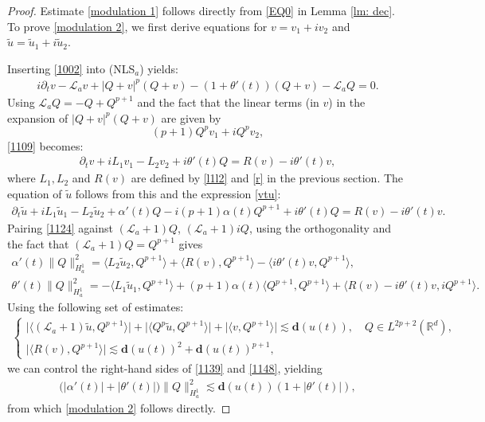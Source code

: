 \documentclass[12pt]{amsart}
\newcommand{\R}{\mathbb R}
\newcommand{\la}{\mathcal L_a}
\newcommand{\nha}{H^1_a}
\begin{document}
\begin{proof}
Estimate \eqref{modulation 1} follows directly from \eqref{EQ0} in Lemma \ref{lm: dec}. To prove \eqref{modulation 2}, we first derive equations for $v=v_1+iv_2$ and $\tilde u=\tilde u_1+i\tilde u_2$. 

Inserting \eqref{1002} into (NLS$_a$) yields:
\begin{align}\label{1109} 
i\partial_t v-\la v+|Q+v|^p(Q+v)-(1+\theta'(t))(Q+v)-\la Q=0. 
\end{align}
Using $\la Q=-Q+Q^{p+1}$ and the fact that the linear terms (in $v$) in the expansion of $|Q+v|^p(Q+v)$ are given by 
\[
(p+1)Q^pv_1+iQ^p v_2,
\]
 \eqref{1109} becomes: 
\begin{align}\label{1162}
\partial_t v+i L_1 v_1-L_2 v_2+i\theta'(t)Q=R(v)-i\theta'(t)v, 
\end{align}
where $L_1, L_2$ and $R(v)$ are defined by \eqref{l1l2} and \eqref{r} in the previous section. 
The equation of $\tilde u$ follows from this and the expression \eqref{vtu}:
\begin{align}\label{1124}
\partial_t \tilde u+iL_1\tilde u_1-L_2\tilde u_2+\alpha'(t)Q - i  (p+1)\alpha(t)Q^{p+1}+i\theta'(t)Q=R(v)-i\theta'(t) v. 
\end{align}
Pairing \eqref{1124} against $(\la+1)Q$, $(\la+1)iQ$, using the orthogonality and the fact that $(\la+1)Q=Q^{p+1}$ gives 
\begin{gather}
\alpha'(t)\|Q\|_{\nha}^2=\langle L_2 \tilde u_2, Q^{p+1}\rangle +\langle R(v), Q^{p+1}\rangle-\langle i\theta'(t) v, Q^{p+1}\rangle,\label{1139}\\
\theta'(t)\|Q\|_{\nha}^2 =-\langle L_1\tilde u_1, Q^{p+1}\rangle +  (p+1) \alpha(t)\langle Q^{p+1},Q^{p+1}\rangle+\langle R(v)-i\theta'(t)v,  i Q^{p+1}\rangle. \label{1148}
\end{gather}
Using the following set of estimates:
\begin{align}\label{1159}
\begin{cases}
\bigl|\langle(\la+1)\tilde u, Q^{p+1}\rangle\bigr|+\bigl| \langle Q^p\tilde u, Q^{p+1}\rangle\bigr|+\bigl|\langle v, Q^{p+1}\rangle\bigr|\lesssim \mathbf{d}(u(t)), \quad  Q \in L^{2p+2}(\R^d), \\
\bigl|\langle R(v), Q^{p+1}\rangle\bigr|\lesssim \mathbf{d}(u(t))^2+\mathbf{d}(u(t))^{p+1},
\end{cases}
\end{align}
we can control the right-hand sides of \eqref{1139} and \eqref{1148}, yielding
\begin{align*}
\bigl(|\alpha'(t)|+|\theta'(t)|\bigr)\|Q\|_{\nha}^2\lesssim \mathbf{d}(u(t))(1+|\theta'(t)|),
\end{align*}
from which \eqref{modulation 2} follows directly. 


\end{proof}
\end{document}
